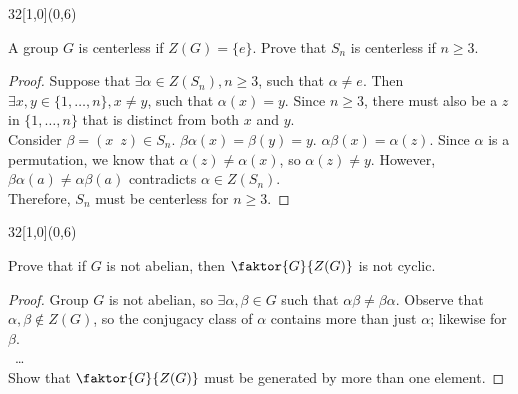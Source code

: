 \documentclass[12pt]{article}
\newenvironment{exercise}[2]{\begin{textblock}{32}[1,0](0,#2)\noindent#1\end{textblock}}{\vspace{1in}}
\begin{document}
  \begin{exercise}{3.1}{6}
    {\noindent}A group $G$ is centerless if $Z(G)=\{e\}$. Prove that $S_n$ is centerless if $n\ge 3$.

    \begin{proof}
      Suppose that $\exists\alpha\in Z(S_n), n\geq 3$, such that $\alpha\neq e$.
      Then $\exists x,y\in\{1,\ldots,n\}, x\neq y$, such that $\alpha(x)=y$.
      Since $n\geq 3$, there must also be a $z$ in $\{1,\ldots,n\}$ that is distinct from both $x$ and $y$.\\
      Consider $\beta = (x\enspace z) \in S_n$.
      $\beta\alpha(x) = \beta(y) = y$.
      $\alpha\beta(x) = \alpha(z)$.
      Since $\alpha$ is a permutation, we know that $\alpha(z)\neq\alpha(x)$, so $\alpha(z)\neq y$.
      However, $\beta\alpha(a)\neq\alpha\beta(a)$ contradicts $\alpha\in Z(S_n)$.\\
      Therefore, $S_n$ must be centerless for $n\geq 3$.
    \end{proof}
  \end{exercise}

  \begin{exercise}{3.3}{6}
    {\noindent}Prove that if $G$ is not abelian, then $\faktor{G}{Z(G)}$ is not cyclic.

    \begin{proof}
      Group $G$ is not abelian, so $\exists\alpha,\beta\in G$ such that $\alpha\beta\neq\beta\alpha$.
      Observe that $\alpha,\beta\not\in Z(G)$, so the conjugacy class of $\alpha$ contains more than just $\alpha$; likewise for $\beta$.\\\
      \dots
      \\
      Show that $\faktor{G}{Z(G)}$ must be generated by more than one element.
    \end{proof}
  \end{exercise}
\end{document}
